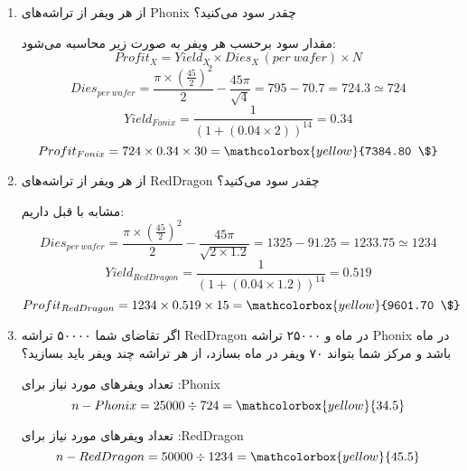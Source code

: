 \begin{enumerate}
	\item از هر ویفر از تراشه‌های Phonix چقدر سود می‌کنید؟
	\begin{qsolve}
مقدار سود برحسب هر ویفر به صورت زیر محاسبه می‌شود:
		\begin{equation}
			Profit_X = Yield_X \times Dies_X\,(per \ wafer) \times N
		\end{equation}
		\begin{equation}
			Dies_{per \ wafer} = \frac{\pi \times ({\frac{45}{2}})^2 }{2} - \frac{45\pi}{\sqrt{4}} = 795 - 70.7 = 724.3 \simeq 724
		\end{equation}
		\begin{equation}
			Yield_{Fonix} = \frac{1}{(1 + (0.04 \times 2))^{14}} = 0.34
		\end{equation}
		\begin{equation}
			Profit_{Fonix} = 724 \times 0.34 \times 30 =\mathcolorbox{yellow}{7384.80 \$}
		\end{equation}
	\end{qsolve}
	\item از هر ویفر از تراشه‌های RedDragon چقدر سود می‌کنید؟
	\begin{qsolve}
مشابه با قبل داریم:
		\begin{equation}
			Dies_{per \ wafer} = \frac{\pi \times ({\frac{45}{2}})^2 }{2} - \frac{45\pi}{\sqrt{2\times 1.2}} = 1325 - 91.25 = 1233.75 \simeq 1234
		\end{equation}
		\begin{equation}
			Yield_{RedDragon} = \frac{1}{(1 + (0.04 \times 1.2))^{14}} = 0.519
		\end{equation}
		\begin{equation}
			Profit_{RedDragon} = 1234 \times 0.519 \times 15 =\mathcolorbox{yellow}{9601.70 \$}
		\end{equation}
	\end{qsolve}
	\item اگر تقاضای شما ۵۰۰۰۰ تراشه RedDragon در ماه و ۲۵۰۰۰ تراشه Phonix در ماه باشد و مرکز شما بتواند ۷۰ ویفر در ماه بسازد، از هر تراشه چند ویفر باید بسازید؟

	\begin{qsolve}
تعداد ویفر‌های مورد نیاز برای :Phonix
	\begin{equation}
		n-Phonix = 25000 \div 724 = \mathcolorbox{yellow}{34.5}
	\end{equation}
	
تعداد ویفر‌های مورد نیاز برای :RedDragon
	\begin{equation}
		n-RedDragon = 50000 \div 1234 = \mathcolorbox{yellow}{45.5}
	\end{equation}
		 
	\end{qsolve}

\end{enumerate}

